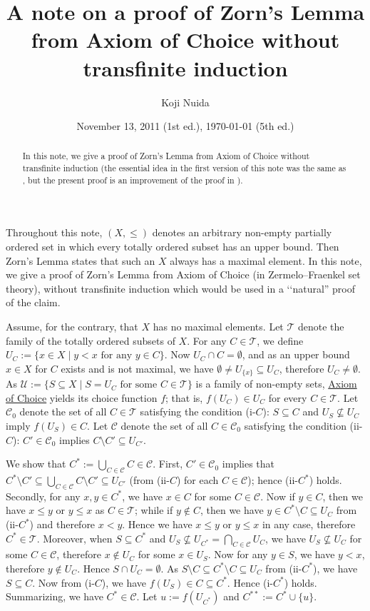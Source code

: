 \documentclass{article}
\title{A note on a proof of Zorn's Lemma from Axiom of Choice without transfinite induction}
\author{Koji Nuida}
\date{November 13, 2011 (1st ed.), \today{} (5th ed.)}
\begin{document}
\maketitle

\begin{abstract}
In this note, we give a proof of Zorn's Lemma from Axiom of Choice without transfinite induction (the essential idea in the first version of this note was the same as \cite[Theorem 4.19]{RubRub85}, but the present proof is an improvement of the proof in \cite{Lewin91}).
\end{abstract}

Throughout this note, $(X,\leq)$ denotes an arbitrary non-empty partially ordered set in which every totally ordered subset has an upper bound.
Then Zorn's Lemma states that such an $X$ always has a maximal element.
In this note, we give a proof of Zorn's Lemma from Axiom of Choice (in Zermelo--Fraenkel set theory), without transfinite induction which would be used in a \lq\lq natural'' proof of the claim.

Assume, for the contrary, that $X$ has no maximal elements.
Let $\mathcal{T}$ denote the family of the totally ordered subsets of $X$.
For any $C \in \mathcal{T}$, we define $U_C := \{ x \in X \mid y < x \mbox{ for any } y \in C \}$.
Now $U_C \cap C = \emptyset$, and as an upper bound $x \in X$ for $C$ exists and is not maximal, we have $\emptyset \neq U_{\{x\}} \subseteq U_C$, therefore $U_C \neq \emptyset$.
As $\mathcal{U} := \{ S \subseteq X \mid S = U_C \mbox{ for some } C \in \mathcal{T} \}$ is a family of non-empty sets, \underline{Axiom of Choice} yields its choice function $f$; that is, $f(U_C) \in U_C$ for every $C \in \mathcal{T}$.
Let $\mathcal{C}_0$ denote the set of all $C \in \mathcal{T}$ satisfying the condition (i-$C$): $S \subseteq C$ and $U_S \not\subseteq U_C$ imply $f(U_S) \in C$.
Let $\mathcal{C}$ denote the set of all $C \in \mathcal{C}_0$ satisfying the condition (ii-$C$): $C' \in \mathcal{C}_0$ implies $C \setminus C' \subseteq U_{C'}$.

We show that $C^* := \bigcup_{C \in \mathcal{C}} C \in \mathcal{C}$.
First, $C' \in \mathcal{C}_0$ implies that $C^* \setminus C' \subseteq \bigcup_{C \in \mathcal{C}} C \setminus C' \subseteq U_{C'}$ (from (ii-$C$) for each $C \in \mathcal{C}$); hence (ii-$C^*$) holds.
Secondly, for any $x,y \in C^*$, we have $x \in C$ for some $C \in \mathcal{C}$.
Now if $y \in C$, then we have $x \leq y$ or $y \leq x$ as $C \in \mathcal{T}$; while if $y \not\in C$, then we have $y \in C^* \setminus C \subseteq U_C$ from (ii-$C^*$) and therefore $x < y$.
Hence we have $x \leq y$ or $y \leq x$ in any case, therefore $C^* \in \mathcal{T}$.
Moreover, when $S \subseteq C^*$ and $U_S \not\subseteq U_{C^*} = \bigcap_{C \in \mathcal{C}} U_C$, we have $U_S \not\subseteq U_C$ for some $C \in \mathcal{C}$, therefore $x \not\in U_C$ for some $x \in U_S$.
Now for any $y \in S$, we have $y < x$, therefore $y \not\in U_C$.
Hence $S \cap U_C = \emptyset$.
As $S \setminus C \subseteq C^* \setminus C \subseteq U_C$ from (ii-$C^*$), we have $S \subseteq C$.
Now from (i-$C$), we have $f(U_S) \in C \subseteq C^*$.
Hence (i-$C^*$) holds.
Summarizing, we have $C^* \in \mathcal{C}$.
Let $u := f(U_{C^*})$ and $C^{**} := C^* \cup \{u\}$.
\end{document}
